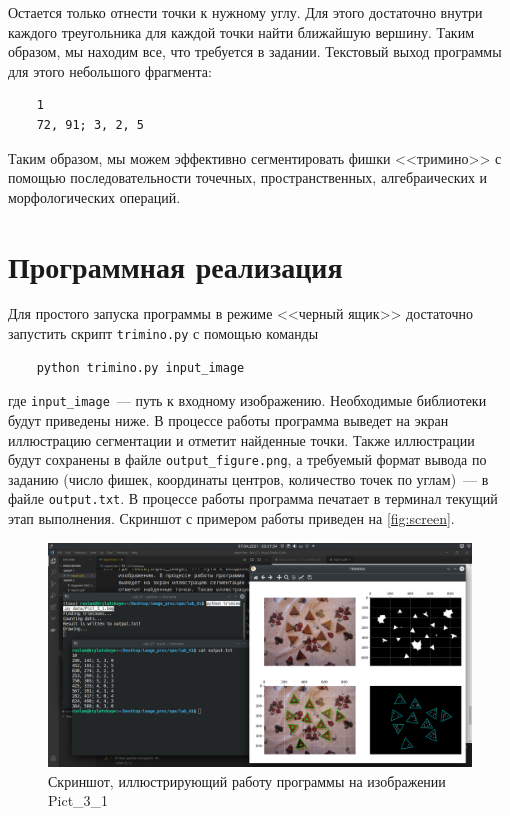 \documentclass[12pt]{article}
\begin{document}
Остается только отнести точки к нужному углу. Для этого достаточно внутри каждого треугольника для каждой точки найти ближайшую вершину. Таким образом, мы находим все, что требуется в задании. Текстовый выход программы для этого небольшого фрагмента:
\begin{verbatim}
    1
    72, 91; 3, 2, 5
\end{verbatim}

Таким образом, мы можем эффективно сегментировать фишки <<тримино>> с помощью последовательности точечных, пространственных, алгебраических и морфологических операций.

\section{Программная реализация}
Для простого запуска программы в режиме <<черный ящик>> достаточно запустить скрипт \verb|trimino.py| с помощью команды
\begin{verbatim}
    python trimino.py input_image
\end{verbatim}
где \verb|input_image|~--- путь к входному изображению. Необходимые библиотеки будут приведены ниже. В процессе работы программа выведет на экран иллюстрацию сегментации и отметит найденные точки. Также иллюстрации будут сохранены в файле \verb|output_figure.png|, а требуемый формат вывода по заданию (число фишек, координаты центров, количество точек по углам)~--- в файле \verb|output.txt|. В процессе работы программа печатает в терминал текущий этап выполнения. Скриншот с примером работы приведен на \autoref{fig:screen}.

\begin{figure}[!h]
    \includegraphics[width=\linewidth]{screenshot.png}
    \centering
    \caption{Скриншот, иллюстрирующий работу программы на изображении Pict\_3\_1}
    \label{fig:screen}
\end{figure}
\end{document}
